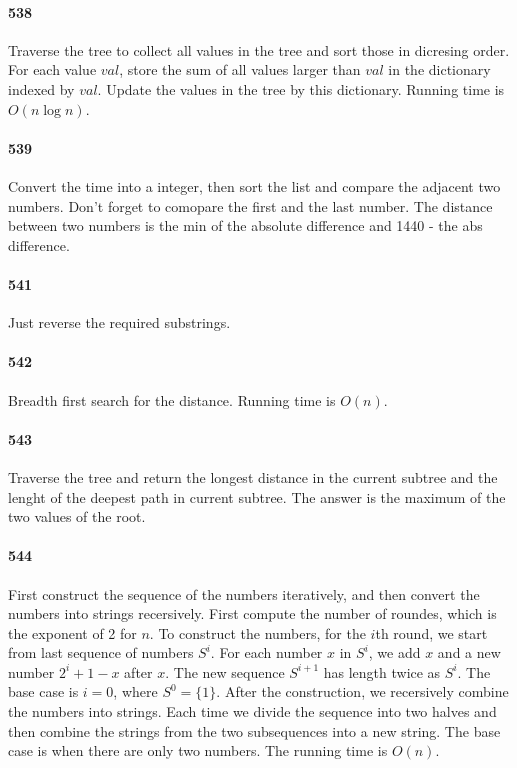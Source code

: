 \documentclass[11pt]{article}
\begin{document}
\begin{itemize}
\paragraph{538}
Traverse the tree to collect all values in the tree and sort those in dicresing order. For each value $val$, store the sum of 
all values larger than $val$ in the dictionary indexed by $val$. Update the values in the tree by this dictionary.
Running time is $O(n \log n)$.

\paragraph{539}
Convert the time into a integer, then sort the list and compare the adjacent two numbers. Don't forget to comopare the first
and the last number. The distance between two numbers is the min of the absolute difference and 1440 - the abs difference.

\paragraph{541}
Just reverse the required substrings.

\paragraph{542}
Breadth first search for the distance. Running time is $O(n)$.

\paragraph{543}
Traverse the tree and return the longest distance in the current subtree and the lenght of the deepest path in current subtree. The answer is the maximum of the two values of the root.

\paragraph{544}
First construct the sequence of the numbers iteratively, and then convert the numbers into strings recersively.
First compute the number of roundes, which is the exponent of 2 for $n$. To construct the numbers, for the $i$th round, we start from last sequence of numbers $S^i$. For each number $x$ in $S^i$, we add $x$ and a new number $2^i+1 - x$ after $x$.
The new sequence $S^{i+1}$ has length twice as $S^i$. The base case is $i = 0$, where $S^0 = \{ 1 \}$.
After the construction, we recersively combine the numbers into strings. Each time we divide the sequence into two halves 
and then combine the strings from the two subsequences into a new string. The base case is when there are only two numbers.
The running time is $O(n)$.


\end{itemize}
\end{document}
